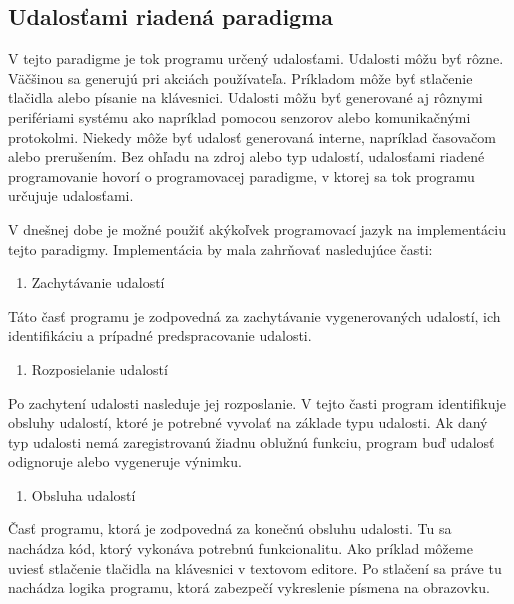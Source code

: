 \subsection{Udalosťami riadená paradigma}
\noindent
V tejto paradigme je tok programu určený udalosťami. Udalosti môžu byť
rôzne. Väčšinou sa generujú pri akciách používateľa. Príkladom môže byť stlačenie tlačidla
alebo písanie na klávesnici. Udalosti môžu byť generované aj rôznymi perifériami systému ako napríklad pomocou senzorov alebo komunikačnými protokolmi. Niekedy môže byť udalosť generovaná interne, napríklad časovačom alebo prerušením. Bez ohľadu na
zdroj alebo typ udalostí, udalosťami riadené programovanie
hovorí o programovacej paradigme, v ktorej sa tok
programu určujuje udalosťami.
\par V dnešnej dobe je možné použiť akýkoľvek programovací jazyk na implementáciu tejto paradigmy. Implementácia by mala zahrňovať nasledujúce časti:
\begin{enumerate}
  \item Zachytávanie udalostí
\end{enumerate}

\noindent \par
Táto časť programu je zodpovedná za zachytávanie vygenerovaných udalostí, ich identifikáciu a prípadné predspracovanie udalosti.

\begin{enumerate}[resume]
  \item Rozposielanie udalostí
\end{enumerate}

\noindent \par
Po zachytení udalosti nasleduje jej rozposlanie. V tejto časti program identifikuje obsluhy udalostí, ktoré je potrebné vyvolať na základe typu udalosti. Ak daný typ udalosti nemá zaregistrovanú žiadnu oblužnú funkciu, program buď udalosť odignoruje alebo vygeneruje výnimku.

\begin{enumerate}[resume]
  \item Obsluha udalostí
\end{enumerate}

\noindent \par
Časť programu, ktorá je zodpovedná za konečnú obsluhu udalosti. Tu sa nachádza kód, ktorý vykonáva potrebnú funkcionalitu. Ako príklad môžeme uviesť stlačenie tlačidla na klávesnici v textovom editore. Po stlačení sa práve tu nachádza logika programu, ktorá zabezpečí vykreslenie písmena na obrazovku.

